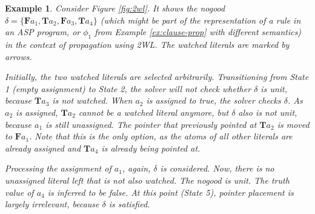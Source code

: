 \documentclass{vutinfth} %
\newtheorem{example}{Example}[chapter]
\newcommand{\bT}{\mathbf{T}}
\newcommand{\bF}{\mathbf{F}}
\begin{document}
\begin{example}
Consider Figure \ref{fig:2wl}. It shows the nogood $\delta = \{\bF a_1, \bT a_2, \bF a_3, \bT a_4 \}$ (which might be part of the representation of a rule in an ASP program, or $\phi_1$ from Example \ref{ex:clause-prop} with different semantics) in the context of propagation using 2WL. The watched literals are marked by arrows.

Initially, the two watched literals are selected arbitrarily. Transitioning from State 1 (empty assignment) to State 2, the solver will not check whether $\delta$ is unit, because $\bT a_3$ is not watched. When $a_2$ is assigned to \emph{true}, the solver checks $\delta$. As $a_2$ is assigned, $\bT a_2$ cannot be a watched literal anymore, but $\delta$ also is not unit, because $a_1$ is still unassigned. The pointer that previously pointed at $\bT a_2$ is moved to $\bF a_1$. Note that this is the only option, as the atoms of all other literals are already assigned and $\bT a_4$ is already being pointed at.

Processing the assignment of $a_1$, again, $\delta$ is considered. Now, there is no unassigned literal left that is not also watched. The nogood is unit. The truth value of $a_4$ is inferred to be \emph{false}. At this point (State 5), pointer placement is largely irrelevant, because $\delta$ is satisfied.
\end{example}
\end{document}
